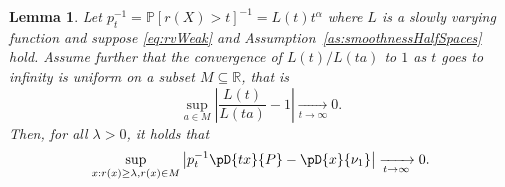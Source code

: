 \documentclass{article}
\numberwithin{equation}{section}
\newtheorem{lemma}{Lemma}[section]
\newcommand{\R}{\mathbb{R}}
\renewcommand{\P}{\mathbb{P}}
\newcommand{\PP}{\P}%
\newcommand{\coD}[2]{\pD{#1}{#2}}
\begin{document}
\begin{lemma}\label{lem:uniform_convergence_all} Let \(p_t^{-1}=
    \PP[r(X)>t]^{-1}=L(t)t^{\alpha}\) where \(L\) is a slowly
    varying function and suppose
    \eqref{eq:rvWeak} and Assumption~\ref{as:smoothnessHalfSpaces}
    hold. Assume further
    that the convergence of \(L(t)/L(ta)\) to \(1\) as \(t\) goes to
    infinity is uniform on a
    subset \(M\subseteq\R\), that is
    \begin{equation}\label{eq:uniform_limit_l_n}
        \sup_{a\in M}
        \left|\frac{L(t)}{L(ta)}-1\right|\xrightarrow[t\to\infty]{} 0.
    \end{equation}
    Then, for all \(\lambda>0\), it holds that
    \begin{equation}
        \sup_{x:r(x)\geq \lambda, r(x)\in M} \left| p_t^{-1}\coD{tx}{P} -
        \coD{x}{\nu_1} \right|\xrightarrow[t\to\infty]{} 0.
    \end{equation}
   
\end{lemma}
\end{document}
